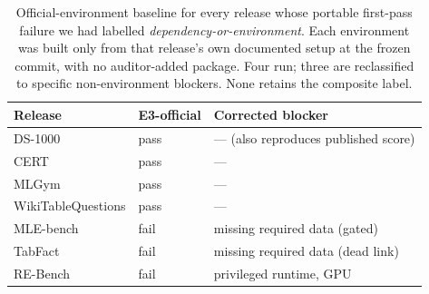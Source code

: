 \begin{table}[t]
\centering
\caption{Official-environment baseline for every release whose portable
first-pass failure we had labelled \emph{dependency-or-environment}. Each
environment was built only from that release's own documented setup at the
frozen commit, with no auditor-added package. Four run; three are reclassified
to specific non-environment blockers. None retains the composite label.}
\label{tab:official}
\small
\begin{tabular}{@{}lll@{}}
\toprule
Release & E3-official & Corrected blocker \\
\midrule
DS-1000            & pass & --- (also reproduces published score) \\
CERT               & pass & --- \\
MLGym              & pass & --- \\
WikiTableQuestions & pass & --- \\
\addlinespace
MLE-bench          & fail & missing required data (gated) \\
TabFact            & fail & missing required data (dead link) \\
RE-Bench           & fail & privileged runtime, GPU \\
\bottomrule
\end{tabular}
\end{table}
